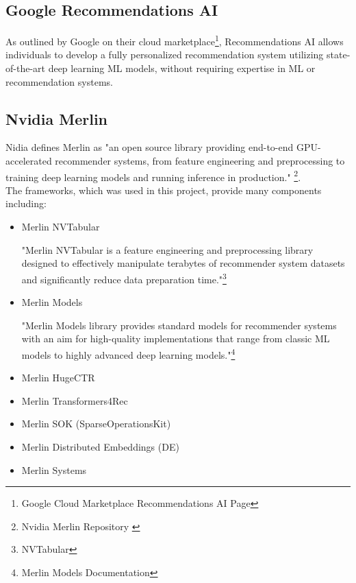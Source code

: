\subsection{Google Recommendations AI}
As outlined by Google on their cloud marketplace\footnote{Google Cloud Marketplace Recommendations AI Page\cite{GoogleMarketplaceRecAi}}, Recommendations AI \cite{GoogleRecommendationsAI} allows individuals to develop a fully personalized recommendation system utilizing state-of-the-art deep learning ML models, without requiring expertise in ML or recommendation systems. \\

\subsection{Nvidia Merlin}

Nidia defines Merlin \cite{NvidiaMerlin} as "an open source library providing end-to-end GPU-accelerated recommender systems, from feature engineering and preprocessing to training deep learning models and running inference in production." \footnote{Nvidia Merlin Repository \cite{NvidiaMerlinRepo}}. 
\\The frameworks, which was used in this project, provide many components including:
\begin{itemize}
    \item Merlin NVTabular\cite{MerlinNVTabular}
    \begin{displayquote}
    "Merlin NVTabular is a feature engineering and preprocessing library designed to effectively manipulate terabytes of recommender system datasets and significantly reduce data preparation time."\footnote{NVTabular\cite{MerlinNVTabular}}
    \end{displayquote}
    \item Merlin Models\cite{MerlinModels}
    \begin{displayquote}
    "Merlin Models library provides standard models for recommender systems with an aim for high-quality implementations that range from classic ML models to highly advanced deep learning models."\footnote{Merlin Models Documentation\cite{MerlinModelsDocs}}
    \end{displayquote}
    \item Merlin HugeCTR \cite{MerlinHugeCTR}
    \item Merlin Transformers4Rec \cite{MerlinTransformer4Rec}
    \item Merlin SOK (SparseOperationsKit)
    \item Merlin Distributed Embeddings (DE)
    \item Merlin Systems \cite{MerlinSystemsRepo}
\end{itemize}

